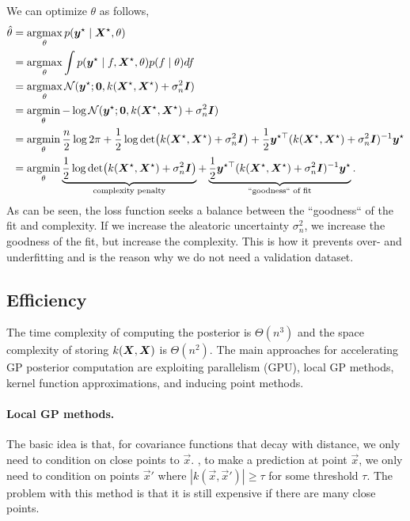 We can optimize $\theta$ as follows,
\begin{align*}
  \hat{\theta} &= \argmax_\theta p(\bm{y}^\star\mid \mat{X}^\star, \theta) \\
  &= \argmax_\theta \int p(\bm{y}^\star\mid f,\mat{X}^\star, \theta) p(f\mid \theta) df \\
  &= \argmax_\theta \mathcal{N}(\bm{y}^\star; \bm{0}, k(\mat{X}^\star,\mat{X}^\star) + \sigma_n^2\bm{I}) \\
  &= \argmin_\theta -\log \mathcal{N}(\bm{y}^\star; \bm{0}, k(\mat{X}^\star,\mat{X}^\star) + \sigma_n^2\bm{I}) \\
  &= \argmin_\theta \frac{n}{2} \log 2\pi + \frac{1}{2}\log \det{k(\mat{X}^\star,\mat{X}^\star)+\sigma_n^2\bm{I}}+ \frac{1}{2}\bm{y}^{\star\top} (k(\mat{X}^\star,\mat{X}^\star) + \sigma_n^2\bm{I})^{-1}\bm{y}^\star \\
  &= \argmin_\theta \underbrace{\frac{1}{2}\log \det{k(\mat{X}^\star,\mat{X}^\star)+\sigma_n^2\bm{I}}}_{\text{complexity penalty}} + \underbrace{\frac{1}{2}\bm{y}^{\star\top} (k(\mat{X}^\star,\mat{X}^\star) + \sigma_n^2\bm{I})^{-1}\bm{y}^\star}_{\text{``goodness`` of fit}}.
\end{align*}
As can be seen, the loss function seeks a balance between the ``goodness`` of
the fit and complexity. If we increase the aleatoric uncertainty
$\sigma_n^2$, we increase the goodness of the fit, but increase the
complexity. This is how it prevents over- and underfitting and is the reason
why we do not need a validation dataset.

\subsection{Efficiency}

The time complexity of computing the posterior is $\Theta(n^3)$ and the space complexity of storing
$k(\bm{X},\bm{X})$ is $\Theta(n^2)$. The main approaches for accelerating GP
posterior computation are exploiting parallelism (GPU), local GP
methods, kernel function approximations, and inducing point methods.

\paragraph{Local GP methods.}

The basic idea is that, for covariance functions that decay with
distance, we only need to condition on close points to $\vec{x}$.
\Ie, to make a prediction at point $\vec{x}$, we only need to condition on
points $\vec{x}'$ where $|k(\vec{x},\vec{x}')|\geq \tau$ for some threshold
$\tau$. The problem with this method is that it is still expensive if there
are many close points.

